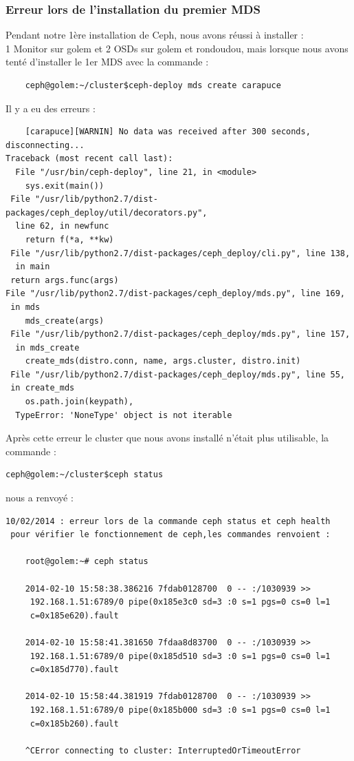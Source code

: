 \documentclass[12pt]{article}
\begin{document}
	\subsubsection{Erreur lors de l'installation du premier MDS}
	Pendant notre 1ère installation de Ceph, nous avons réussi à installer :
	\\ 1 Monitor sur golem et 2 OSDs sur golem et rondoudou, mais lorsque nous avons tenté d'installer le 1er MDS avec la commande :
	\begin{verbatim}
	ceph@golem:~/cluster$ceph-deploy mds create carapuce
	\end{verbatim}
	
	Il y a eu des erreurs :
	\begin{verbatim}
	[carapuce][WARNIN] No data was received after 300 seconds, disconnecting...
Traceback (most recent call last):
  File "/usr/bin/ceph-deploy", line 21, in <module>
    sys.exit(main())
 File "/usr/lib/python2.7/dist-packages/ceph_deploy/util/decorators.py",
  line 62, in newfunc
    return f(*a, **kw)
 File "/usr/lib/python2.7/dist-packages/ceph_deploy/cli.py", line 138,
  in main
 return args.func(args)
File "/usr/lib/python2.7/dist-packages/ceph_deploy/mds.py", line 169,
 in mds
    mds_create(args)
 File "/usr/lib/python2.7/dist-packages/ceph_deploy/mds.py", line 157,
  in mds_create
    create_mds(distro.conn, name, args.cluster, distro.init)
 File "/usr/lib/python2.7/dist-packages/ceph_deploy/mds.py", line 55, 
 in create_mds
    os.path.join(keypath),
  TypeError: 'NoneType' object is not iterable 
	\end{verbatim}

Après cette erreur le cluster que nous avons installé n’était plus utilisable, la commande :
\begin{verbatim}
ceph@golem:~/cluster$ceph status
\end{verbatim}
nous a renvoyé :
\begin{verbatim}
10/02/2014 : erreur lors de la commande ceph status et ceph health
 pour vérifier le fonctionnement de ceph,les commandes renvoient :

    root@golem:~# ceph status

    2014-02-10 15:58:38.386216 7fdab0128700  0 -- :/1030939 >>
     192.168.1.51:6789/0 pipe(0x185e3c0 sd=3 :0 s=1 pgs=0 cs=0 l=1 
     c=0x185e620).fault

    2014-02-10 15:58:41.381650 7fdaa8d83700  0 -- :/1030939 >>
     192.168.1.51:6789/0 pipe(0x185d510 sd=3 :0 s=1 pgs=0 cs=0 l=1 
     c=0x185d770).fault

    2014-02-10 15:58:44.381919 7fdab0128700  0 -- :/1030939 >>
     192.168.1.51:6789/0 pipe(0x185b000 sd=3 :0 s=1 pgs=0 cs=0 l=1 
     c=0x185b260).fault

    ^CError connecting to cluster: InterruptedOrTimeoutError
\end{verbatim}
\end{document}
